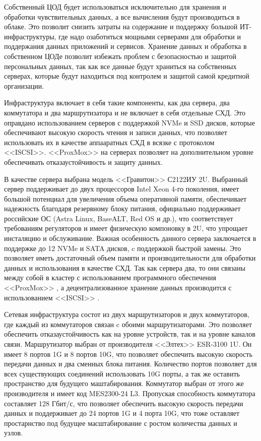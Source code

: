 \documentclass[14pt, a4paper]{extarticle}
\begin{document}
Собственный ЦОД будет использоваться исключительно для хранения и обработки чувствительных 
данных, а все  вычисления будут производиться в облаке. Это позволит снизить затраты на
содержание и поддержку большой ИТ-инфраструктуры, где надо озаботиться мощными
серверами для обработки и поддержания данных приложений и сервисов. Хранение 
данных и обработка в собственном ЦОДе позволит избежать проблем с безопасностью и защитой
персональных данных, так как все данные будут храниться на собственных серверах,
которые будут находиться под контролем и защитой самой кредитной организации.

Инфраструктура включает в себя такие компоненты, как два сервера, два коммутатора 
и два маршрутизатора и не включает в себя отдельные СХД. Это оправдано использованием
серверов с поддержкой NVMe и SSD дисков, которые обеспечивают высокую скорость
чтения и записи данных, что позволяет использовать их в качестве аппааратных СХД
в всязке с протоколом <<ISCSI>>. <<ProxMox>> на серверах позволяет 
на дополнительном уровне обеспечивать отказаустойчивость и защиту данных.

В качестве сервера выбрана модель <<Гравитон>> С2122ИУ \cite{graviton-server-s2121iv} 2U.
Выбранный сервер поддерживает до двух процессоров Intel Xeon 4-го поколения, имеет 
большой потенциал для увеличения объема оперативной памяти, обеспечивает надежность
благодаря резервному блоку питания, официально поддерживает российские ОС (Astra Linux,
BaseALT, Red OS и др.), что соответствует требованиям регуляторов и имеет физическую
компоновку в 2U, что упрощает инсталяцию и обслуживание. Важная особенность данного
сервера заключается в поддержке до 12 NVMe и SATA дисков, c поддержкой быстрой замены. 
Это позволяет иметь достаточный объем памяти и производительности для обработки
данных и использования в качестве СХД. Так как сервера два, то они связаны между собой
в кластер с использованием программного обеспечения <<ProxMox>> \cite{prox-mox}, а 
децентрализованное хранение данных производится с использованием <<ISCSI>> \cite{iscsi}.

Сетевая инфраструктура состот из двух маршрутизаторов и двух коммутаторов, где каждый 
из коммутаторов связан c обоими маршрутизаторами. Это позволяет обеспечить отказаустойчивость
как на уровне устройств, так и на уровне каналов связи. Маршрутизатор выбран от производителя 
<<Элтех>> ESR-3100 \cite{eltech-ESR-3100} 1U. Он имеет 8 портов 1G и 8 портов 10G, 
что позволяет обеспечить  высокую скорость передачи данных и два сменных блока питания. 
Количество портов позволяет для всех существующих соединений использовать 10G порты, а так
же оставить пространство для будущего маштабирования. Коммутатор выбран от этого же 
производителя и имеет код MES2300-24 \cite{eltech-MES2300-24} L3. Пропуская способность 
коммутатора составляет 128 Гбит/с, что позволяет обеспечить высокую скорость передачи данных
и поддерживает до 24 портов 1G и 4 порта 10G, что тоже оставляет простарнство под будущее
масштабирование с ростом количества данных и узлов.
\end{document}
